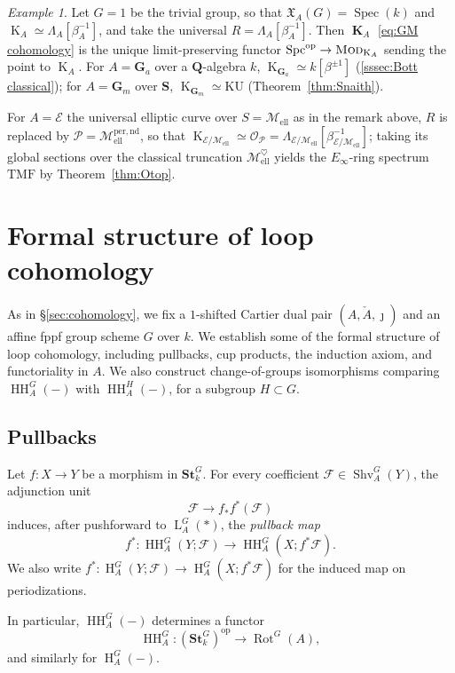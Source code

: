 \documentclass[12pt, oneside]{amsart}
\numberwithin{equation}{section}
\theoremstyle{remark}
\newtheorem{example}[subsubsection]{Example}
\theoremstyle{plain}
\newcommand{\Mod}{\textsc{Mod}}
\newcommand{\frX}{\mathfrak{X}}
\newcommand{\lam}{\Lambda}
\newcommand{\Loop}{\operatorname{L}}
\newcommand{\OO}{\mathcal{O}}
\DeclareMathOperator{\spc}{Spec}
\newcommand{\GGa}{\mathbf{G}_{a}}
\newcommand{\GGm}{\mathbf{G}_{m}}
\newcommand{\bQ}{\mathbf{Q}}
\newcommand{\Stk}{\mathbf{St}_{k}}
\newcommand{\HH}{\operatorname{HH}}
\newcommand{\Hcoh}{\operatorname{H}}
\newcommand{\K}{\operatorname{K}}
\newcommand{\Kcoh}{\operatorname{\mathbf{K}}}
\newcommand{\Mell}{\mathcal{M}_{\mathrm{ell}}}
\newcommand{\Shv}{\operatorname{Shv}}
\newcommand{\Rot}{\operatorname{Rot}}
\newcommand{\cF}{\mathcal{F}}
\begin{document}
\begin{example}\label{exam:KAG G=1}
  Let $G = 1$ be the trivial group, so that $\frX_A(G) = \spc(k)$ and $\K_A \simeq \lam_A[\beta_A^{-1}]$, and take the universal $R=\lam_A[\beta_A^{-1}]$.
  Then $\Kcoh_A$ \eqref{eq:GM cohomology} is the unique limit-preserving functor $\operatorname{Spc}^{\mathrm{op}} \to \Mod_{\K_A}$ sending the point to $\K_A$.
  For $A = \GGa$ over a $\bQ$-algebra $k$, $\K_{\GGa} \simeq k[\beta^{\pm 1}]$ (\ref{sssec:Bott classical}); for $A = \GGm$ over $\mathbf{S}$, $\K_{\GGm} \simeq \mathrm{KU}$ (Theorem~\ref{thm:Snaith}).

  For $A=\mathcal{E}$ the universal elliptic curve over $S=\Mell$ as in the remark above, $R$ is replaced by $\mathcal{P} = \Mell^{\mathrm{per},\mathrm{nd}}$, so that $\K_{\mathcal{E}/\Mell} \simeq \OO_{\mathcal{P}} = \lam_{\mathcal{E}/\Mell}[\beta_{\mathcal{E}/\Mell}^{-1}]$; taking its global sections over the classical truncation $\Mell^{\heartsuit}$ yields the $E_\infty$-ring spectrum $\mathrm{TMF}$ by Theorem~\ref{thm:Otop}.
\end{example}

\section{Formal structure of loop cohomology}\label{sec:coh formal}

As in \S \ref{sec:cohomology}, we fix a $1$-shifted Cartier dual pair $(A, \check{A}, \jmath)$ and an affine fppf group scheme $G$ over $k$.
We establish some of the formal structure of loop cohomology, including pullbacks, cup products, the induction axiom, and functoriality in $A$.
We also construct change-of-groups isomorphisms comparing $\HH_A^G(-)$ with $\HH_A^H(-)$, for a subgroup $H \subset G$.

\subsection{Pullbacks}\label{ssec:coh pullbacks}

Let $f : X \to Y$ be a morphism in $\Stk^G$.
For every coefficient $\cF \in \Shv_A^G(Y)$, the adjunction unit
\[
  \cF \to f_* f^*(\cF)
\]
induces, after pushforward to $\Loop_A^G(*)$, the \emph{pullback map}
\[ f^* : \HH_A^G(Y; \cF) \to \HH_A^G(X; f^*\cF). \]
We also write $f^* : \Hcoh_A^G(Y; \cF) \to \Hcoh_A^G(X; f^*\cF)$ for the induced map on periodizations.

In particular, $\HH_A^G(-)$ determines a functor
\[\HH_A^G : (\Stk^G)^{\mathrm{op}} \longrightarrow \Rot^G(A),\]
and similarly for $\Hcoh_A^G(-)$.
\end{document}
